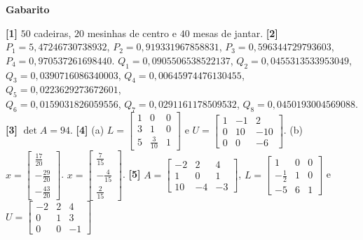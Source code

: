 \documentclass[11pt,a4paper]{article}
\begin{document}
\begin{center}
\textbf{Gabarito}
\end{center} 
\textbf{[1]} $50$ cadeiras, $20$ mesinhas de centro e $40$ mesas de jantar. 
\textbf{[2]} $P_1 = 5,47246730738932$, $P_2 = 0,919331967858831$, $P_3 = 0,596344729793603$, $P_4 = 0,970537261698440$. 
$Q_1 = 0,0905506538522137$, $Q_2 = 0,0455313533953049$, $Q_3 = 0,0390716086340003$, $Q_4 = 0,00645974476130455$, 
$Q_5 = 0,0223629273672601$, \\ $Q_6 = 0,0159031826059556$, $Q_7 = 0,0291161178509532$, $Q_8 = 0,0450193004569088$.
\textbf{[3]} $\det A = 94$.
\textbf{[4]} (a) $L = \begin{bmatrix}1 & 0 & 0 \\ 3 & 1 & 0 \\ 5 & \frac{3}{10} & 1\end{bmatrix}$ e 
$U = \begin{bmatrix} 1 & -1 & 2 \\ 0 & 10 & -10 \\ 0 & 0 & -6 \end{bmatrix}$. 
(b) $x = 
\begin{bmatrix}
\frac{17}{20} \\
-\frac{29}{20} \\
-\frac{43}{20}
\end{bmatrix}
$. 
$x = 
\begin{bmatrix}
\frac{7}{15} \\
-\frac{4}{15} \\
\frac{2}{15}
\end{bmatrix}
$. 
\textbf{[5]} $A = \begin{bmatrix}-2 & 2 & 4 \\ 1 & 0 & 1\\ 10 & -4 & -3\end{bmatrix}$, 
$L = \begin{bmatrix}1 & 0 & 0 \\ -\frac{1}{2} & 1 & 0 \\ -5 & 6 & 1\end{bmatrix}$ e  
$U = \begin{bmatrix}-2 & 2 & 4 \\ 0 & 1 & 3 \\ 0 & 0 & -1\end{bmatrix}$
\end{document}
